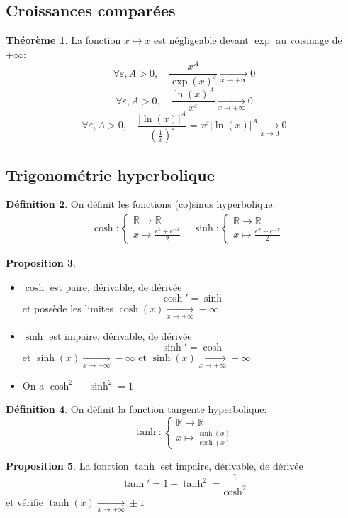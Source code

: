 \documentclass[10pt,a4paper]{article}
\theoremstyle{definition}
\newtheorem{proposition}{Proposition}[section]
\newtheorem{theorem}[proposition]{Théorème}
\newtheorem{definition}[proposition]{Définition}
\begin{document}
\subsection{Croissances comparées}
\begin{theorem}
La fonction $x \mapsto x$ est \uline{négligeable devant $\exp$ au voisinage de $+\infty$}:
\[ \forall \varepsilon, A > 0,\quad \frac{x^A}{\exp(x)^\varepsilon} \xrightarrow[x \to +\infty]{} 0 \]
\[ \forall \varepsilon, A > 0,\quad \frac{\ln(x)^A}{x^\varepsilon} \xrightarrow[x \to +\infty]{} 0 \]
\[ \forall \varepsilon, A > 0,\quad \frac{\left| \ln(x) \right|^A}{\left(\frac{1}{x}\right)^\varepsilon} = x^\varepsilon \left| \ln(x) \right|^A \xrightarrow[x \to 0]{} 0\]
\end{theorem}

\subsection{Trigonométrie hyperbolique}
\begin{definition}
On définit les fonctions \uline{(co)sinus hyperbolique}:
\begin{align*}
&\cosh: \begin{cases}
\mathbb{R} \to \mathbb{R} \\
x \mapsto \frac{e^x + e^{-x}}{2} 
\end{cases} &\sinh: \begin{cases}
\mathbb{R} \to \mathbb{R} \\
x \mapsto \frac{e^x - e^{-x}}{2}
\end{cases}
\end{align*}
\end{definition}

\pagebreak

\begin{proposition}
\hfill
\begin{itemize}
\item $\cosh$ est paire, dérivable, de dérivée
\[\cosh' = \sinh\]
 et possède les limites $\cosh(x) \xrightarrow[x \to \pm\infty]{} +\infty$
\item $\sinh$ est impaire, dérivable, de dérivée
\[\sinh' = \cosh\]
et $\sinh(x) \xrightarrow[x \to -\infty]{} -\infty$ et $\sinh(x) \xrightarrow[x \to +\infty]{} +\infty$
\item On a $\cosh^2 - \sinh^2 = 1$
\end{itemize}
\end{proposition}
\begin{definition}
On définit la fonction tangente hyperbolique:
\[ \tanh: \begin{cases}
\mathbb{R} \to \mathbb{R} \\
x \mapsto \frac{\sinh(x)}{\cosh(x)}
\end{cases} \]
\end{definition}
\begin{proposition}
La fonction $\tanh$ est impaire, dérivable, de dérivée
\[\tanh' = 1 - \tanh^2 = \frac{1}{\cosh^2}\]
et vérifie $\tanh(x) \xrightarrow[x \to \pm\infty]{} \pm1$
\end{proposition}
\end{document}
